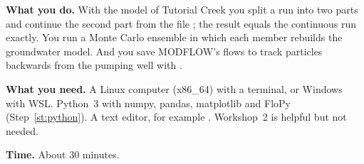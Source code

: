 \begin{goal}
\textbf{What you do.} With the model of Tutorial Creek you split a run into two parts and continue the second part from the
file ; the result equals the continuous run exactly. You run a Monte Carlo ensemble in which each member
rebuilds the groundwater model. And you save MODFLOW's flows to track particles backwards from the pumping well with
.

\textbf{What you need.} A Linux computer (x86\_64) with a terminal, or Windows with WSL. Python~3 with numpy, pandas,
matplotlib and FloPy (Step~\ref{st:python}). A text editor, for example . Workshop~2 is helpful but not needed.

\textbf{Time.} About 30 minutes.
\end{goal}

